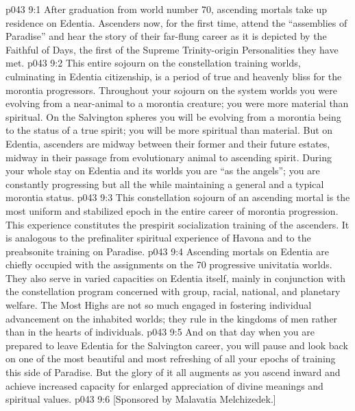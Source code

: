 \vs p043 9:1 After graduation from world number 70, ascending mortals take up residence on Edentia. Ascenders now, for the first time, attend the “assemblies of Paradise” and hear the story of their far\hyp{}flung career as it is depicted by the Faithful of Days, the first of the Supreme Trinity\hyp{}origin Personalities they have met.
\vs p043 9:2 \pc This entire sojourn on the constellation training worlds, culminating in Edentia citizenship, is a period of true and heavenly bliss for the morontia progressors. Throughout your sojourn on the system worlds you were evolving from a near\hyp{}animal to a morontia creature; you were more material than spiritual. On the Salvington spheres you will be evolving from a morontia being to the status of a true spirit; you will be more spiritual than material. But on Edentia, ascenders are midway between their former and their future estates, midway in their passage from evolutionary animal to ascending spirit. During your whole stay on Edentia and its worlds you are “as the angels”; you are constantly progressing but all the while maintaining a general and a typical morontia status.
\vs p043 9:3 This constellation sojourn of an ascending mortal is the most uniform and stabilized epoch in the entire career of morontia progression. This experience constitutes the prespirit socialization training of the ascenders. It is analogous to the prefinaliter spiritual experience of Havona and to the preabsonite training on Paradise.
\vs p043 9:4 \pc Ascending mortals on Edentia are chiefly occupied with the assignments on the 70 progressive univitatia worlds. They also serve in varied capacities on Edentia itself, mainly in conjunction with the constellation program concerned with group, racial, national, and planetary welfare. The Most Highs are not so much engaged in fostering individual advancement on the inhabited worlds; they rule in the kingdoms of men rather than in the hearts of individuals.
\vs p043 9:5 And on that day when you are prepared to leave Edentia for the Salvington career, you will pause and look back on one of the most beautiful and most refreshing of all your epochs of training this side of Paradise. But the glory of it all augments as you ascend inward and achieve increased capacity for enlarged appreciation of divine meanings and spiritual values.
\vsetoff
\vs p043 9:6 [Sponsored by Malavatia Melchizedek.]
